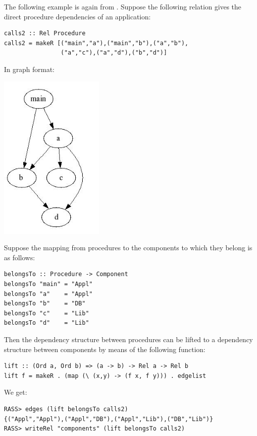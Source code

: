 \documentclass[11pt]{article}
\newlength{\fminilength}
\newenvironment{fminipage}[1][\linewidth]
 {\setlength{\fminilength}{#1-2\fboxsep-2\fboxrule-1em}%
  \bigskip\begin{lrbox}{\fminibox}\quad\begin{minipage}{\fminilength}\bigskip}
 {\smallskip\end{minipage}\end{lrbox}\noindent\fbox{\usebox{\fminibox}}\bigskip}
\newcommand{\bc}{\begin{fminipage}}
\newcommand{\ec}{\end{fminipage}}
\begin{document}
The following example is again from \cite{Klint03:atitr}.
Suppose the following relation gives the direct procedure dependencies of 
an application: 

\bc\begin{verbatim}
calls2 :: Rel Procedure 
calls2 = makeR [("main","a"),("main","b"),("a","b"),
                ("a","c"),("a","d"),("b","d")]
\end{verbatim}\ec

In graph format: 

\begin{center}
\includegraphics[width=2in]{calls2}
\end{center}

Suppose the mapping from procedures to the components to which they belong is 
as follows: 

\bc\begin{verbatim} 
belongsTo :: Procedure -> Component 
belongsTo "main" = "Appl"
belongsTo "a"    = "Appl"
belongsTo "b"    = "DB"
belongsTo "c"    = "Lib"
belongsTo "d"    = "Lib"
\end{verbatim}\ec

Then the dependency structure between procedures can be lifted to a 
dependency structure between components by means of the following function: 

\bc\begin{verbatim}
lift :: (Ord a, Ord b) => (a -> b) -> Rel a -> Rel b
lift f = makeR . (map (\ (x,y) -> (f x, f y))) . edgelist
\end{verbatim}\ec 

We get:

\begin{verbatim} 
RASS> edges (lift belongsTo calls2)
{("Appl","Appl"),("Appl","DB"),("Appl","Lib"),("DB","Lib")}
RASS> writeRel "components" (lift belongsTo calls2)
\end{verbatim}
\end{document}
